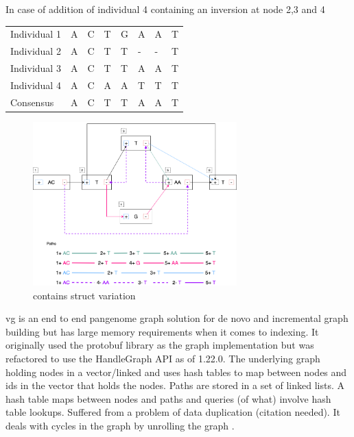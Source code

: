 \documentclass[a4paper]{article}
\begin{document}
\newpage
In case of addition of individual 4 containing an inversion at node 2,3 and 4

\begin{center}
\begin{tabular}{llllllll}
\color{mypink}Individual 1 & \color{mypink} A & \color{mypink} C & \color{mypink} T & \color{mypink} G & \color{mypink} A & \color{mypink} A & \color{mypink} T\\
\color{myblue}Individual 2 & \color{myblue} A & \color{myblue} C & \color{myblue} T & \color{myblue} T & \color{myblue} - & \color{myblue} - & \color{myblue} T\\
\color{mygreen}Individual 3 & \color{mygreen} A & \color{mygreen} C & \color{mygreen} T & \color{mygreen} T & \color{mygreen} A & \color{mygreen} A & \color{mygreen} T\\
\color{mypurple}Individual 4 & \color{mypurple} A & \color{mypurple} C & \color{mypurple} A & \color{mypurple} A & \color{mypurple} T & \color{mypurple} T & \color{mypurple} T\\
\hline
\color{red}Consensus & \color{red} A & \color{red} C & \color{red} T & \color{red} T & \color{red} A & \color{myred} A & \color{red} T\\
\end{tabular}
\end{center}


\begin{figure}[H]
\centering
\includegraphics[width=0.7\textwidth]{figures/Variation Graph-Page-2.png} 
\caption{contains struct variation}\label{contains struct}
\end{figure}

vg \cite{garrisonVariationGraphToolkit2018} is an end to end pangenome graph
solution for de novo and incremental graph building but has large memory
requirements when it comes to indexing.
It originally used the protobuf library as the graph implementation but was
refactored to use the HandleGraph API as of 1.22.0.
The underlying graph holding nodes in a vector/linked and uses hash tables to
 map between nodes and ids in the vector that holds the nodes.
Paths are stored in a set of linked lists. 
A hash table maps between nodes and paths and queries (of what) involve hash
table lookups.
Suffered from a problem of data duplication (citation needed).
It deals with cycles in the graph by unrolling the graph
\cite{liDesignConstructionReference2020}.
\end{document}

